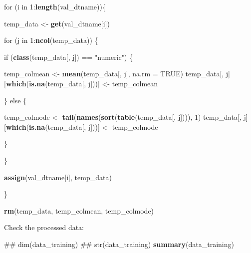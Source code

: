 \documentclass[]{article}
\newenvironment{Shaded}{\begin{snugshade}}{\end{snugshade}}
\newcommand{\KeywordTok}[1]{\textcolor[rgb]{0.13,0.29,0.53}{\textbf{{#1}}}}
\newcommand{\DataTypeTok}[1]{\textcolor[rgb]{0.13,0.29,0.53}{{#1}}}
\newcommand{\DecValTok}[1]{\textcolor[rgb]{0.00,0.00,0.81}{{#1}}}
\newcommand{\StringTok}[1]{\textcolor[rgb]{0.31,0.60,0.02}{{#1}}}
\newcommand{\OtherTok}[1]{\textcolor[rgb]{0.56,0.35,0.01}{{#1}}}
\newcommand{\NormalTok}[1]{{#1}}
\begin{document}
\begin{Shaded}
\begin{Highlighting}[]
\NormalTok{for (i in }\DecValTok{1}\NormalTok{:}\KeywordTok{length}\NormalTok{(val_dtname))\{}
  
  \NormalTok{temp_data <-}\StringTok{ }\KeywordTok{get}\NormalTok{(val_dtname[i])}
  
  \NormalTok{for (j in }\DecValTok{1}\NormalTok{:}\KeywordTok{ncol}\NormalTok{(temp_data)) \{}
    
    \NormalTok{if (}\KeywordTok{class}\NormalTok{(temp_data[, j]) ==}\StringTok{ "numeric"}\NormalTok{) \{}
      
      \NormalTok{temp_colmean <-}\StringTok{ }\KeywordTok{mean}\NormalTok{(temp_data[, j], }\DataTypeTok{na.rm =} \OtherTok{TRUE}\NormalTok{)}
      \NormalTok{temp_data[, j][}\KeywordTok{which}\NormalTok{(}\KeywordTok{is.na}\NormalTok{(temp_data[, j]))] <-}\StringTok{ }\NormalTok{temp_colmean}
      
    \NormalTok{\} else \{}
      
      \NormalTok{temp_colmode <-}\StringTok{ }\KeywordTok{tail}\NormalTok{(}\KeywordTok{names}\NormalTok{(}\KeywordTok{sort}\NormalTok{(}\KeywordTok{table}\NormalTok{(temp_data[, j]))), }\DecValTok{1}\NormalTok{)}
      \NormalTok{temp_data[, j][}\KeywordTok{which}\NormalTok{(}\KeywordTok{is.na}\NormalTok{(temp_data[, j]))] <-}\StringTok{ }\NormalTok{temp_colmode}

    \NormalTok{\}}
    
  \NormalTok{\}}
   
  \KeywordTok{assign}\NormalTok{(val_dtname[i], temp_data)}

\NormalTok{\}}
  
\KeywordTok{rm}\NormalTok{(temp_data, temp_colmean, temp_colmode)}
\end{Highlighting}
\end{Shaded}

Check the processed data:

\begin{Shaded}
\begin{Highlighting}[]
\NormalTok{## dim(data_training)}
\NormalTok{## str(data_training)}
\KeywordTok{summary}\NormalTok{(data_training)}
\end{Highlighting}
\end{Shaded}
\end{document}
